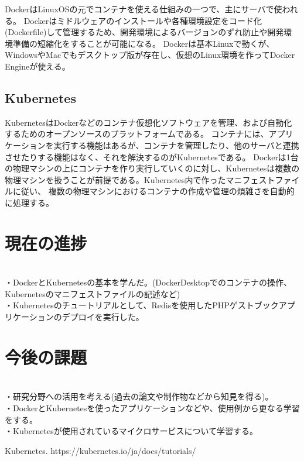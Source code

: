 \documentclass[11pt]{jarticle}
\begin{document}
DockerはLinuxOSの元でコンテナを使える仕組みの一つで、主にサーバで使われる。
Dockerはミドルウェアのインストールや各種環境設定をコード化(Dockerfile)して管理するため、開発環境によるバージョンのずれ防止や開発環境準備の短縮化をすることが可能になる。
Dockerは基本Linuxで動くが、WindowsやMacでもデスクトップ版が存在し、仮想のLinux環境を作ってDocker Engineが使える。

\subsection{Kubernetes}

KubernetesはDockerなどのコンテナ仮想化ソフトウェアを管理、および自動化するためのオープンソースのプラットフォームである。
コンテナには、アプリケーションを実行する機能はあるが、コンテナを管理したり、他のサーバと連携させたりする機能はなく、それを解決するのがKubernetesである。
Dockerは1台の物理マシンの上にコンテナを作り実行していくのに対し、Kubernetesは複数の物理マシンを扱うことが前提である。Kubernetes内で作ったマニフェストファイルに従い、
複数の物理マシンにおけるコンテナの作成や管理の煩雑さを自動的に処理する。
\section{現在の進捗}\mbox{}\\
・DockerとKubernetesの基本を学んだ。(DockerDesktopでのコンテナの操作、Kubernetesのマニフェストファイルの記述など)
\\
・Kubernetesのチュートリアルとして、Redisを使用したPHPゲストブックアプリケーションのデプロイを実行した。\cite{redis}
\section{今後の課題}\mbox{}\\
・研究分野への活用を考える(過去の論文や制作物などから知見を得る)。
\\
・DockerとKubernetesを使ったアプリケーションなどや、使用例から更なる学習をする。
\\
・Kubernetesが使用されているマイクロサービスについて学習する。

\begin{thebibliography}{99}
   Kubernetes. https://kubernetes.io/ja/docs/tutorials/
\end{thebibliography}
\end{document}
